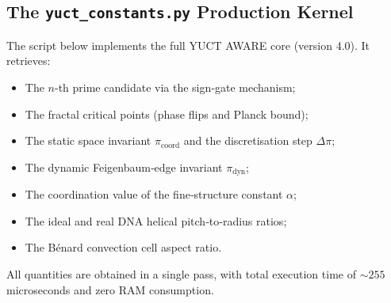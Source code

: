 \documentclass[12pt,a4paper]{article}
\begin{document}
	\subsection{The \texttt{yuct\_constants.py} Production Kernel}
	
	The script below implements the full YUCT AWARE core (version 4.0). It retrieves:
	\begin{itemize}[nosep]
		\item The $n$-th prime candidate via the sign‑gate mechanism;
		\item The fractal critical points (phase flips and Planck bound);
		\item The static space invariant $\pi_{\mathrm{coord}}$ and the discretisation step $\Delta\pi$;
		\item The dynamic Feigenbaum‑edge invariant $\pi_{\mathrm{dyn}}$;
		\item The coordination value of the fine‑structure constant $\alpha$;
		\item The ideal and real DNA helical pitch‑to‑radius ratios;
		\item The Bénard convection cell aspect ratio.
	\end{itemize}
	All quantities are obtained in a single pass, with total execution time of $\sim 255$ microseconds and zero RAM consumption.
	
\end{document}

